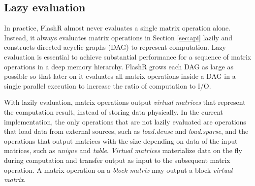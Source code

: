 


\subsection{Lazy evaluation}\label{sec:lazyeval}

In practice, FlashR almost never evaluates a single matrix operation alone.
Instead, it always evaluates matrix operations in Section \ref{sec:api}
lazily and constructs directed acyclic graphs (DAG) to represent computation.
Lazy evaluation is essential to achieve substantial performance for a sequence
of matrix operations in a deep memory hierarchy. FlashR grows each DAG as large
as possible so that later on it evaluates all matrix operations inside a DAG
in a single parallel execution to increase the ratio of computation to I/O.

With lazily evaluation, matrix operations
output \textit{virtual matrices} that represent the computation result,
instead of storing data physically. In the current implementation,
the only operations that are not lazily evaluated are operations that
load data from external sources, such as \textit{load.dense} and
\textit{load.sparse}, and the operations that output matrices
with the size depending on data of the input matrices, such as \textit{unique}
and \textit{table}.
\textit{Virtual matrices} materialize data on the fly during computation
and transfer output as input to the subsequent matrix operation.
A matrix operation on a \textit{block matrix} may output
a block \textit{virtual matrix}.


